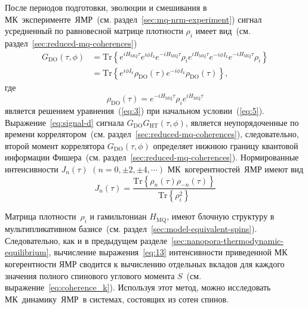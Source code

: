 После периодов подготовки, эволюции и смешивания в МК~эксперименте~ЯМР~(см. раздел~\ref{sec:mq-nrm-experiment})
сигнал усредненный по равновесной матрице плотности $\rho_i$
имеет вид~(см. раздел~\ref{sec:reduced-mq-coherences})
%
\begin{equation}\label{eq:signal-do}
  \begin{split}
    G_\mathrm{DO}(\tau,\phi)
    & = \mathrm{Tr}\left\{
      e^{i H_\mathrm{MQ} \tau} e^{i\phi I_\mathrm{z}} e^{-i H_\mathrm{MQ}\tau}
      \rho_i
      e^{i H_\mathrm{MQ} \tau} e^{-i \phi I_\mathrm{z}} e^{-i H_\mathrm{MQ} \tau}
      \rho_i
    \right\} \\
    & = \mathrm{Tr} \left\{
    e^{i \phi I_\mathrm{z}}
    \rho_\mathrm{DO}(\tau)
    e^{-i \phi I_\mathrm{z}}
    \rho_\mathrm{DO}(\tau)
    \right\},
  \end{split}
\end{equation}
%
где
%
\begin{equation}
  \label{eq:9}
  \rho_\mathrm{DO}(\tau)
  = e^{-i H_\mathrm{MQ} \tau }
  \rho_i
  e^{i H_\mathrm{MQ} \tau}
\end{equation}
%
является решением уравнения~(\ref{eq:3}) при начальном условии~(\ref{eq:5}).
Выражение~\ref{eq:signal-d} сигнала  $G_\mathrm{DO}G_\mathrm{HT}(\tau,\phi)$,
является неупорядоченные по времени коррелятором~(см. раздел~\ref{sec:reduced-mq-coherences}),
следовательно, второй момент коррелятора $G_\mathrm{DO}(\tau,\phi)$ определяет
нижнюю границу квантовой информации Фишера~(см. раздел~\ref{sec:reduced-mq-coherences}).
Нормированные интенсивности $J_{n}(\tau)$ $(n=0, \pm 2, \pm 4, \cdots)$ МК~когерентностей~ЯМР
имеют вид
%
\begin{equation}\label{eq:13}
  J_{n}(\tau) = \dfrac{\mathrm{Tr} \left\{
  \rho_{n}(\tau) \rho_{-n}(\tau)
  \right\}}
  {\mathrm{Tr} \left\{\rho^2_{i} \right\}}
\end{equation}


Матрица плотности~$\rho_i$ и гамильтониан $H_\mathrm{MQ}$,
имеют блочную структуру в мультипликативном базисе~(см. раздел~\ref{sec:model-equivalent-spins}).
Следовательно, как и в предыдущем разделе~\ref{sec:nanopora-thermodynamic-equilibrium},
вычисление выражения~\ref{eq:13} интенсивности приведенной МК когерентности ЯМР сводится
к вычислению отдельных вкладов
для каждого значения полного спинового углового момента $S$~(см. выражение~\ref{eq:coherence_k}).
Используя этот метод, можно исследовать МК~динамику~ЯМР~в системах, состоящих из сотен спинов.


